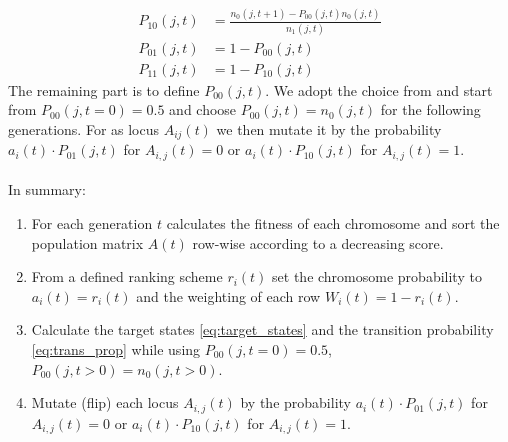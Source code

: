 \begin{align}
  P_{10}(j,t) &= \frac{n_0(j, t+1) - P_{00}(j,t)n_0(j, t)}{n_1(j,t)} \\
  P_{01}(j,t) &= 1 - P_{00}(j,t) \\
  P_{11}(j,t) &= 1 - P_{10}(j,t)
  \label{eq:trans_prop}
\end{align}
The remaining part is to define $P_{00}(j,t)$. We adopt the choice from \cite{Wang2010} and start from $P_{00}(j, t = 0) = 0.5$ and choose $P_{00}(j,t) = n_0(j,t)$ for the following generations. For as locus $A_{ij}(t)$ we then mutate it by the probability $a_i(t) \cdot P_{01}(j, t)$ for $A_{i,j}(t) = 0$ or $a_i(t) \cdot P_{10}(j, t)$ for $A_{i,j}(t) = 1$.
\\
\\
In summary:
\begin{enumerate}
  \item For each generation $t$ calculates the fitness of each chromosome and sort the population matrix $A(t)$ row-wise according to a decreasing score. 
  \item From a defined ranking scheme $r_i(t)$ set the chromosome probability to $a_i(t) = r_i(t)$ and the weighting of each row $W_i(t) = 1 - r_i(t)$.
  \item Calculate the target states \cref{eq:target_states}  and the transition probability \cref{eq:trans_prop} while using $P_{00}(j, t = 0) = 0.5$, $P_{00}(j,t>0) = n_0(j,t>0)$.
  \item Mutate (flip) each locus $A_{i,j}(t)$ by the probability $a_i(t) \cdot P_{01}(j, t)$ for $A_{i,j}(t) = 0$ or $a_i(t) \cdot P_{10}(j, t)$ for $A_{i,j}(t) = 1$.
\end{enumerate}








